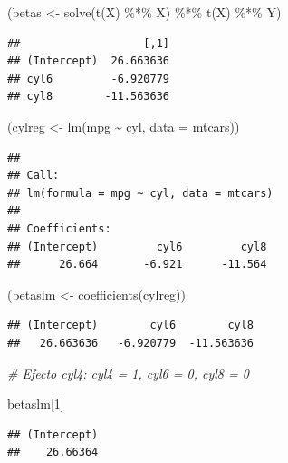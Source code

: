 \documentclass[
  12pt,
]{book}
\newenvironment{Shaded}{\begin{snugshade}}{\end{snugshade}}
\newcommand{\AttributeTok}[1]{\textcolor[rgb]{0.77,0.63,0.00}{#1}}
\newcommand{\CommentTok}[1]{\textcolor[rgb]{0.56,0.35,0.01}{\textit{#1}}}
\newcommand{\DecValTok}[1]{\textcolor[rgb]{0.00,0.00,0.81}{#1}}
\newcommand{\FunctionTok}[1]{\textcolor[rgb]{0.00,0.00,0.00}{#1}}
\newcommand{\NormalTok}[1]{#1}
\newcommand{\OtherTok}[1]{\textcolor[rgb]{0.56,0.35,0.01}{#1}}
\newcommand{\SpecialCharTok}[1]{\textcolor[rgb]{0.00,0.00,0.00}{#1}}
\begin{document}
\begin{Shaded}
\begin{Highlighting}[]
\NormalTok{(betas }\OtherTok{\textless{}{-}} \FunctionTok{solve}\NormalTok{(}\FunctionTok{t}\NormalTok{(X) }\SpecialCharTok{\%*\%}\NormalTok{ X) }\SpecialCharTok{\%*\%} \FunctionTok{t}\NormalTok{(X) }\SpecialCharTok{\%*\%}\NormalTok{ Y)}
\end{Highlighting}
\end{Shaded}

\begin{verbatim}
##                   [,1]
## (Intercept)  26.663636
## cyl6         -6.920779
## cyl8        -11.563636
\end{verbatim}

\begin{Shaded}
\begin{Highlighting}[]
\NormalTok{(cylreg }\OtherTok{\textless{}{-}} \FunctionTok{lm}\NormalTok{(mpg }\SpecialCharTok{\textasciitilde{}}\NormalTok{ cyl, }\AttributeTok{data =}\NormalTok{ mtcars))}
\end{Highlighting}
\end{Shaded}

\begin{verbatim}
## 
## Call:
## lm(formula = mpg ~ cyl, data = mtcars)
## 
## Coefficients:
## (Intercept)         cyl6         cyl8  
##      26.664       -6.921      -11.564
\end{verbatim}

\begin{Shaded}
\begin{Highlighting}[]
\NormalTok{(betaslm }\OtherTok{\textless{}{-}} \FunctionTok{coefficients}\NormalTok{(cylreg))}
\end{Highlighting}
\end{Shaded}

\begin{verbatim}
## (Intercept)        cyl6        cyl8 
##   26.663636   -6.920779  -11.563636
\end{verbatim}

\begin{Shaded}
\begin{Highlighting}[]
\CommentTok{\# Efecto cyl4: cyl4 = 1, cyl6 = 0, cyl8 = 0}

\NormalTok{betaslm[}\DecValTok{1}\NormalTok{]}
\end{Highlighting}
\end{Shaded}

\begin{verbatim}
## (Intercept) 
##    26.66364
\end{verbatim}
\end{document}
